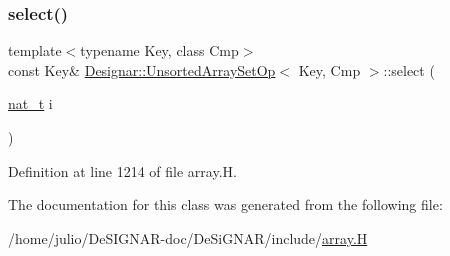 \subsubsection{\texorpdfstring{select()}{select()}}
{\footnotesize\ttfamily template$<$typename Key, class Cmp$>$ \\
const Key\& \hyperlink{class_designar_1_1_unsorted_array_set_op}{Designar\+::\+Unsorted\+Array\+Set\+Op}$<$ Key, Cmp $>$\+::select (\begin{DoxyParamCaption}\item[{\hyperlink{namespace_designar_aa72662848b9f4815e7bf31a7cf3e33d1}{nat\+\_\+t}}]{i }\end{DoxyParamCaption})\hspace{0.3cm}{\ttfamily [inline]}}



Definition at line 1214 of file array.\+H.



The documentation for this class was generated from the following file\+:\begin{DoxyCompactItemize}
\item 
/home/julio/\+De\+S\+I\+G\+N\+A\+R-\/doc/\+De\+Si\+G\+N\+A\+R/include/\hyperlink{array_8_h}{array.\+H}\end{DoxyCompactItemize}
